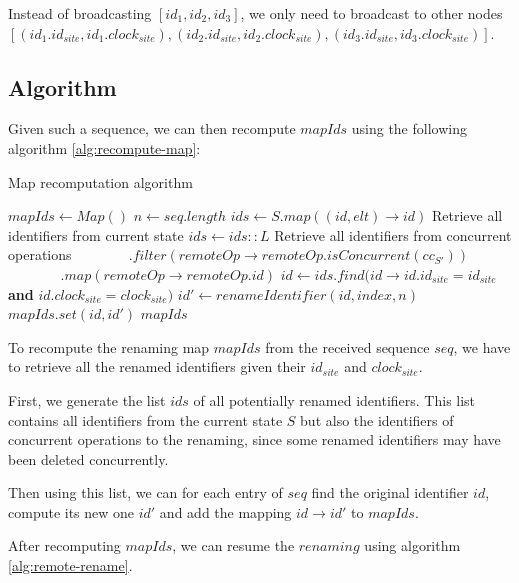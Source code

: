 \documentclass[a4paper]{article}
\begin{document}
Instead of broadcasting $[id_1, id_2, id_3]$,
we only need to broadcast to other nodes
$[(id_1.id_{site}, id_1.clock_{site}),
(id_2.id_{site}, id_2.clock_{site}),
(id_3.id_{site}, id_3.clock_{site})]$.

\subsection{Algorithm}

Given such a sequence, we can then recompute $mapIds$
using the following algorithm \ref{alg:recompute-map}:


\begin{algorithm}
  \caption{Map recomputation algorithm}
  \label{alg:recompute-map}
  \begin{algorithmic}
      \State $mapIds \gets Map()$
      \State $n \gets seq.length$
      \State $ids \gets S.map((id, elt) \to id)$
      \Comment Retrieve all identifiers from current state
      \State $ids \gets ids :: L$
      \Comment Retrieve all identifiers from concurrent operations
      \State $~~~~~~~~~~~~~~~~~.filter(remoteOp \to remoteOp.isConcurrent(cc_{S'}))$
      \State $~~~~~~~~~~~~~~~~~.map(remoteOp \to remoteOp.id)$
        \State $id \gets ids.find(id \to id.id_{site} = id_{site}$ \textbf{and} $id.clock_{site} = clock_{site})$
        \State $id' \gets renameIdentifier(id, index, n)$
        \State $mapIds.set(id, id')$
      \EndFor
      \State \Return $mapIds$
    \EndFunction
  \end{algorithmic}
\end{algorithm}

To recompute the renaming map $mapIds$ from the received sequence $seq$,
we have to retrieve all the renamed identifiers given their $id_{site}$ and
$clock_{site}$.

First, we generate the list $ids$ of all potentially renamed identifiers.
This list contains all identifiers from the current state $S$ but also the identifiers
of concurrent operations to the renaming, since some renamed identifiers may have
been deleted concurrently.

Then using this list, we can for each entry of $seq$ find the original identifier
$id$, compute its new one $id'$ and add the mapping $id \to id'$ to $mapIds$.

After recomputing $mapIds$, we can resume the $renaming$ using algorithm \ref{alg:remote-rename}.
\end{document}
